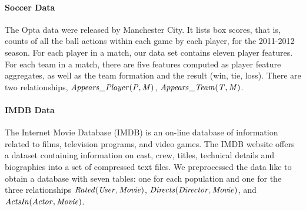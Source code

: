 \documentclass[conference]{IEEEtran}
\begin{document}
				\paragraph{Soccer Data} 
The Opta data were released by Manchester City. 
It lists box scores, that is, counts of all the ball actions within each game by each player, for the 2011-2012 season. 
For each player in a match, our data set contains eleven player features.
For each team in a match, there are five features computed as player feature aggregates, as well as the team formation and the result (win, tie, loss). 
There are two relationships, $\it{Appears\_Player}(P,M)$, $\it{Appears\_Team}(T,M)$. 

				\paragraph{IMDB Data} 
The Internet Movie Database (IMDB) is an on-line database of information related to films, television programs, and video games.
The IMDB website offers a dataset containing information on cast, crew, titles, technical details and biographies into a set of compressed text files. 
We preprocessed the data like \cite{Peralta2007} to obtain a database with seven tables: one for each population and one for the three relationships $\it{Rated}(\it{User},\it{Movie})$, $\it{Directs}(\it{Director},\it{Movie})$, and $\it{ActsIn}(\mathit{Actor},\it{Movie})$.
				
\end{document}
